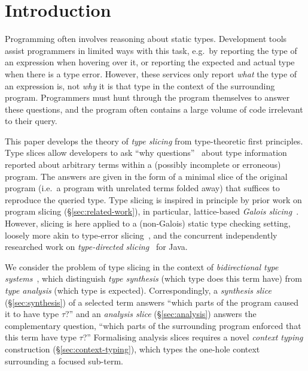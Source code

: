 \section{Introduction}
\label{sec:intro}
\label{firstcontentpage}

Programming often involves reasoning about static types.
Development tools assist programmers in limited ways with this task, 
e.g.\ by reporting the type of an expression when hovering over it, or reporting the expected and actual type when there is a type error.
However, these services only report \emph{what} the type of an expression is, not \emph{why} it is that type 
in the context of the surrounding program.
Programmers must hunt through the program themselves to answer these questions, and the program often contains a large volume of code irrelevant to their query.

This paper develops the theory of \textit{type slicing} from type-theoretic first principles. Type slices allow developers to ask ``why questions''~\cite{developers-ask-why-questions} about type information reported about arbitrary terms within a (possibly incomplete or erroneous) program. The answers are given in the form of a minimal slice of the original program (i.e.\ a program with unrelated terms folded away) that suffices to reproduce the queried type. 
Type slicing is inspired in principle by prior work on program slicing (\S\ref{sec:related-work}), in particular, lattice-based \textit{Galois slicing}~\cite{Perera2012,Ricciotti2017,PereraGarg2016,PereraVis2022,AtkeyPerera2025}. However, slicing is here applied to a (non-Galois) static type checking setting, loosely more akin to type-error slicing~\cite{Wand1986,HaackWells2003,TipDinesh2001}, and the concurrent independently researched work on \emph{type-directed slicing}~\cite{TypeDirectedSlicing} for Java.

We consider the problem of type slicing in the context of \emph{bidirectional type systems}~\cite{BidirectionalTypes}, which distinguish \emph{type synthesis} (which type does this term have) from \emph{type analysis} (which type is expected).
Correspondingly, a \textit{synthesis slice} (\S\ref{sec:synthesis}) of a selected term answers ``which parts of the program caused it to have type $\tau$?'' and an \textit{analysis slice} (\S\ref{sec:analysis}) answers the complementary question, ``which parts of the surrounding program enforced that this term have type $\tau$?''
Formalising analysis slices requires a novel \textit{context typing} construction (\S\ref{sec:context-typing}), which types the one-hole context surrounding a focused sub-term.

